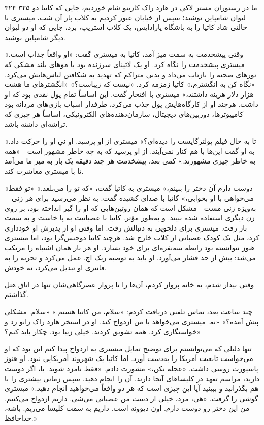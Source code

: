 ۳۲۴  
۳۲۵  
ما در رستوران مستر لاکی در هارد راک کازینو شام خوردیم، جایی که کاتیا دو لیوان شامپاین نوشید؛ سپس از خیابان عبور کردیم به کلاب پار  
آن شب، میستری با حالتی شاد کاتیا را به باشگاه پارادایس، یک کلاب استریپ، برد، جایی که او دو لیوان دیگر شامپاین نوشید.   

وقتی پیشخدمت به سمت میز آمد، کاتیا به میستری گفت:  
«او واقعاً جذاب است.» میستری پیشخدمت را نگاه کرد. او یک لاتینای سرزنده بود با موهای بلند مشکی که نورهای صحنه را بازتاب می‌داد و بدنی متراکم که تهدید به شکافتن لباس‌هایش می‌کرد.  
«نگاه کن به انگشترم،» کاتیا زمزمه کرد. «نیست که زیباست؟»  
«انگشترهای ما هشت هزار دلار هزینه داشتند،» میستری با افتخار گفت. این اساساً تمام پول نقدی بود که او داشت. هرچند او از کارگاه‌هایش پول جذب می‌کرد، طرفدار اسباب بازی‌های مردانه بود—کامپیوترها، دوربین‌های دیجیتال، سازمان‌دهنده‌های الکترونیکی، اساساً هر چیزی که تراشه‌ای داشته باشد.  

«تا به حال فیلم پولترگایست را دیده‌ای؟» میستری از او پرسید. او نیِ او را حرکت داد. به او گفت این‌ها با هم کنار نمی‌آیند. از او پرسید که به چه خاطر مشهور است—«همه به خاطر چیزی مشهورند.» کمی بعد، پیشخدمت هر چند دقیقه یک بار به میز ما می‌آمد تا با میستری معاشرت کند.  

«دوست دارم آن دختر را ببینم،» میستری به کاتیا گفت، «که تو را می‌بلعد.»  
«تو فقط می‌خواهی با او بخوابی،» کاتیا با صدای کشیده گفت. به نظر می‌رسید برای هر زنی—به‌ویژه زنی مست—‌مشکل است که همان روتین‌هایی که او را گیر انداخته بود، بر روی زن دیگری استفاده شده ببیند. و به‌طور مؤثر.  
کاتیا با عصبانیت به پا خاست و به سمت بار رفت. میستری برای دلجویی به دنبالش رفت. اما وقتی او از پذیرش او خودداری کرد، مثل یک کودک عصبانی از کلاب خارج شد. هرچند کاتیا دوجنس‌گرا بود، اما میستری هنوز نتوانسته بود رابطه سه‌نفره‌ای برای خود بسازد. او هر بار همان اشتباه را مرتکب می‌شد: بیش از حد فشار می‌آورد. او باید به توصیه ریک اچ. عمل می‌کرد و تجربه را به فانتزی او تبدیل می‌کرد، نه خودش.  

وقتی بیدار شدم، به خانه پرواز کردم، آن‌ها را تا پرواز عصرگاهی‌شان تنها در اتاق هتل گذاشتم.  

چند ساعت بعد، تماس تلفنی دریافت کردم: «سلام، من کاتیا هستم.»  
«سلام. مشکلی پیش آمده؟» «نه. میستری می‌خواهد با من ازدواج کند. او در استخر هارد راک زانو زد و خواستگاری کرد. همه تشویق کردند. خیلی زیبا بود. چکار باید کنم؟»  

تنها دلیلی که می‌توانستم برای توضیح تمایل میستری به ازدواج پیدا کنم این بود که او می‌خواست تابعیت آمریکا را به‌دست آورد. اما کاتیا یک شهروند آمریکایی نبود. او هنوز پاسپورت روسی داشت.  
«عجله نکن،» مشورت دادم. «فقط نامزد شوید. یا، اگر دوست دارید، مراسم تعهد در کلیساهای آنجا دارند. آن را انجام دهید. سپس زمانی بیشتری را با هم بگذرانید و ببینید آیا این چیزی است که هر دو واقعاً می‌خواهید انجام دهید.»  
میستری گوشی را گرفت. «هی، مرد، خیلی از دست من عصبانی می‌شی. داریم ازدواج می‌کنیم. من این دختر رو دوست دارم. اون دیوونه است. داریم به سمت کلیسا می‌ریم. باشه، خداحافظ.»  

